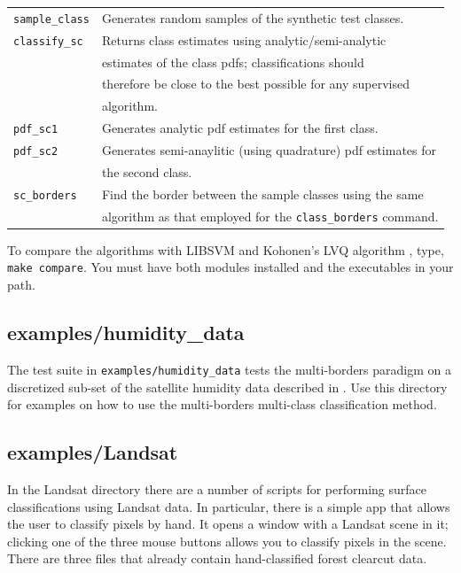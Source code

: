 \documentclass[12pt]{article}
\begin{document}
\begin{tabular}{ll}
\verb/sample_class/ & Generates random samples of the synthetic test classes.\\
\verb/classify_sc/ & Returns class estimates using analytic/semi-analytic \\
		   & estimates of the class pdfs; classifications should \\
		     & therefore be close to the best possible for any supervised \\
       & algorithm.\\
\verb/pdf_sc1/ & Generates analytic pdf estimates for the first class.\\
\verb/pdf_sc2/ & Generates semi-anaylitic (using quadrature) pdf estimates for \\
	       & the second class.\\
\verb/sc_borders/ & Find the border between the sample classes using the same \\
		  & algorithm as that employed for the \verb"class_borders" command.
\end{tabular}

  To compare the algorithms with LIBSVM \citep{Chang_Lin2011} and Kohonen's LVQ algorithm \citep{Kohonen2000}, type, \verb"make compare".  You must have both modules installed and the executables in your path.

\subsection{examples/humidity\_data}

The test suite in \verb"examples/humidity_data" tests the multi-borders paradigm on a discretized sub-set of the satellite humidity data described in \citet{Mills2009}.  Use this directory for examples on how to use the multi-borders multi-class classification method.

\subsection{examples/Landsat}

In the Landsat directory there are a number of scripts for performing surface classifications using Landsat data.  In particular, there is a simple app that allows the user to classify pixels by hand.  It opens a window with a Landsat scene in it; clicking one of the three mouse buttons allows you to classify pixels in the scene.  There are three files that already contain hand-classified forest clearcut data.


\nocite{Kohonen2000}
\nocite{Michie_etal1994}
\nocite{Terrell_Scott1992}
\nocite{Mills2018}
\nocite{Mills2018a}
\nocite{Mueller_etal2001}


\end{document}
